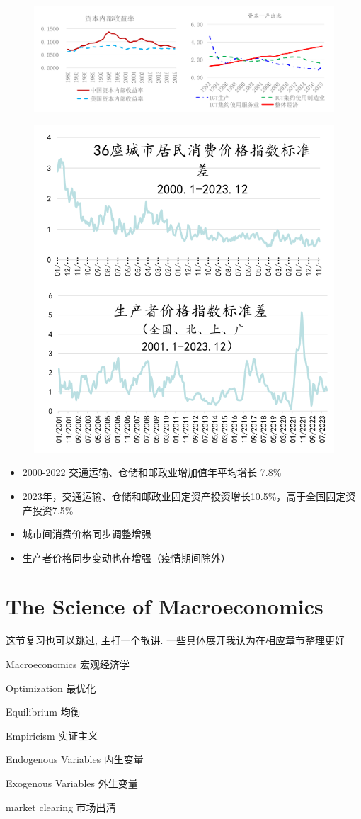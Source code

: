 \begin{figure}[htbp]
    \centering
    \includegraphics[width=0.75\linewidth]{image/科技赋能助力经济增长.png}
\end{figure}
\begin{figure}[htbp]
    \centering
    \includegraphics[width=0.4\linewidth]{image/统一市场.png}
\end{figure}

\begin{itemize}
    \item 2000-2022 交通运输、仓储和邮政业增加值年平均增长 7.8\%
    \item 2023年，交通运输、仓储和邮政业固定资产投资增长10.5\%，高于全国固定资产投资7.5\%
    \item 城市间消费价格同步调整增强
    \item 生产者价格同步变动也在增强（疫情期间除外）
\end{itemize}


\chapter{The Science of Macroeconomics}

这节复习也可以跳过, 主打一个散讲. 一些具体展开我认为在相应章节整理更好

\begin{introduction}[Keywords]
\item Macroeconomics 宏观经济学
\item Optimization 最优化
\item Equilibrium 均衡
\item Empiricism 实证主义
\item Endogenous Variables 内生变量
\item Exogenous Variables 外生变量
\item market clearing 市场出清
\end{introduction}

